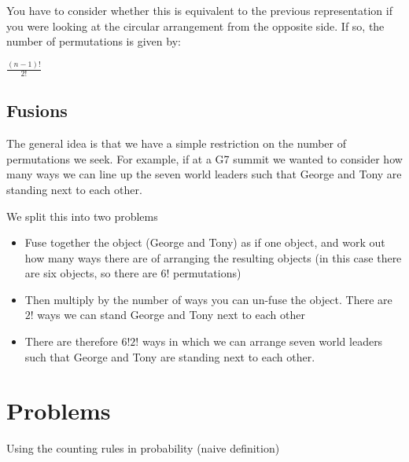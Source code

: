 \documentclass[12pt]{extbook}
\begin{document}
You have to consider whether this is equivalent to the previous representation if you were looking at the circular arrangement from the opposite side.   If so, the number of permutations is given by:

$\frac{(n-1)!}{2!}$


\subsection{Fusions}

The general idea is that we have a simple restriction on the number of permutations we seek.   For example, if at a G7 summit we wanted to consider how many ways we can line up the seven world leaders such that George and Tony are standing next to each other.

We split this into two problems
\begin{itemize}
\item Fuse together the object (George and Tony) as if one object, and work out how many ways there are of arranging the resulting objects (in this case there are six objects, so there are $6!$ permutations)
\item Then multiply by the number of ways you can un-fuse the object.   There are $2!$ ways we can stand George and Tony next to each other
\item There are therefore $6!2!$ ways in which we can arrange seven world leaders such that George and Tony are standing next to each other.
\end{itemize}





\section{Problems}

\begin{enumerate}







\end{enumerate}


Using the counting rules in probability (naive definition)

\begin{enumerate}

\end{enumerate}
\end{document}
